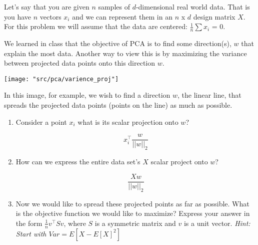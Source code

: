 
Let's say that you are given $n$ samples of $d$-dimensional real world data. That is you have $n$ vectors $x_i$ and we can represent them in an $n$ x $d$ design matrix $X$. For this problem we will assume that the data are centered: $\frac{1}{n}\sum{{x_i}}$ = $0$.

\begin{Parts}

\Part 
We learned in class that the objective of PCA is to find some direction(s), $w$ that explain the most data. Another way to view this is by maximizing the variance between projected data points onto this direction $w$.
\begin{center}
    \texttt{[image: "src/pca/varience\_proj"]}
\end{center}
In this image, for example, we wish to find a direction $w$, the linear line, that spreads the projected data points (points on the line) as much as possible.

\begin{enumerate}
    \item Consider a point $x_i$ what is its scalar projection onto $w$?
    
    \begin{solution}
    \begin{equation*}
        x_{i}^{\top} \frac{w}{||w||_2}
    \end{equation*}
\end{solution}
    
    \item How can we express the entire data set's $X$ scalar project onto $w$?
    
    \begin{solution}
    \begin{equation*}
        \frac{Xw}{||w||_2}
    \end{equation*}
\end{solution}
    
    \item Now we would like to spread these projected points as far as possible. What is the objective function we would like to maximize? Express your answer in the form $\frac{1}{n} v^{\top} S v$, where $S$ is a symmetric matrix and $v$ is a unit vector. \textit{Hint: Start with $Var = E[X - E[X]^2]$} 
    

\end{enumerate}
\end{Parts}
